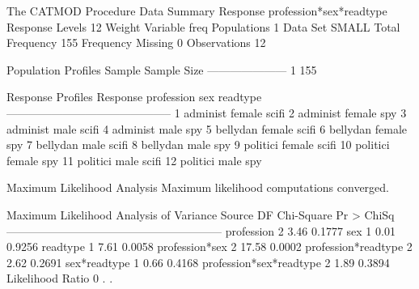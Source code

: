 \documentclass{article}
\begin{document}
\begin{Woutput}
The CATMOD Procedure
                           Data Summary
Response           profession*sex*readtype     Response Levels   12
Weight Variable    freq                        Populations        1
Data Set           SMALL                       Total Frequency  155
Frequency Missing  0                           Observations      12

 Population Profiles
Sample    Sample Size
---------------------
    1             155

             Response Profiles
Response    profession    sex       readtype
--------------------------------------------
    1       administ      female    scifi
    2       administ      female    spy
    3       administ      male      scifi
    4       administ      male      spy
    5       bellydan      female    scifi
    6       bellydan      female    spy
    7       bellydan      male      scifi
    8       bellydan      male      spy
    9       politici      female    scifi
   10       politici      female    spy
   11       politici      male      scifi
   12       politici      male      spy

                   Maximum Likelihood Analysis
           Maximum likelihood computations converged.

         Maximum Likelihood Analysis of Variance
Source                      DF   Chi-Square    Pr > ChiSq
---------------------------------------------------------
profession                   2         3.46        0.1777
sex                          1         0.01        0.9256
readtype                     1         7.61        0.0058
profession*sex               2        17.58        0.0002
profession*readtype          2         2.62        0.2691
sex*readtype                 1         0.66        0.4168
profession*sex*readtype      2         1.89        0.3894
Likelihood Ratio             0          .           .


\end{Woutput}
\end{document}
